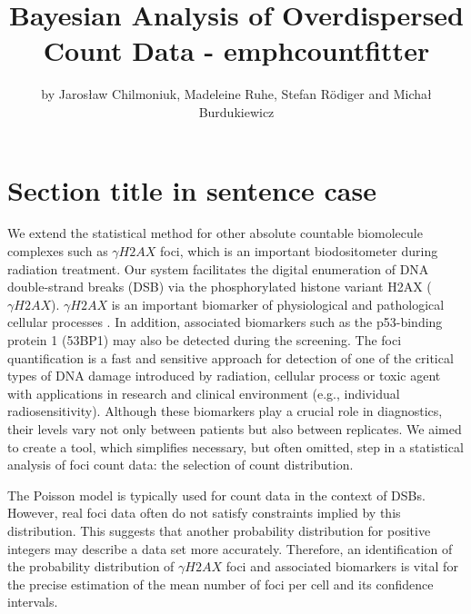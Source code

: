 \title{Bayesian Analysis of Overdispersed Count Data - emph{countfitter}}
\author{by Jaros\l{}aw Chilmoniuk, Madeleine Ruhe, Stefan R\"{o}diger and Micha\l{} Burdukiewicz}

\maketitle


\section{Section title in sentence case}

We extend the statistical method for other absolute countable 
biomolecule complexes such as $\gamma H2AX$ foci, which is an important 
biodositometer during radiation treatment. Our system facilitates the digital 
enumeration of DNA double-strand breaks (DSB) via the phosphorylated histone 
variant H2AX ($\gamma H2AX$). $\gamma H2AX$ is an important biomarker of physiological 
and pathological cellular processes \citep{reddig_2018, rodiger_quantification_2018}. In addition, associated biomarkers such as 
the p53-binding protein 1 (53BP1) may also be detected during the screening. The 
foci quantification is a fast and sensitive approach for detection of one of the 
critical types of DNA damage introduced by radiation, cellular process or toxic 
agent with applications in research and clinical environment (e.g., individual 
radiosensitivity). Although these biomarkers play a crucial role in diagnostics, 
their levels vary not only between patients but also between replicates. We 
aimed to create a tool, which simplifies necessary, but often omitted, step in a 
statistical analysis of foci count data: the selection of count distribution.

The Poisson model is typically used for count data in the context of DSBs. However, 
real foci data often do not satisfy constraints implied by this distribution. 
This suggests that another probability distribution for positive integers may 
describe a data set more accurately. Therefore, an identification of the probability 
distribution of $\gamma H2AX$ foci and associated biomarkers is vital for the 
precise estimation of the mean number of foci per cell and its confidence 
intervals.

